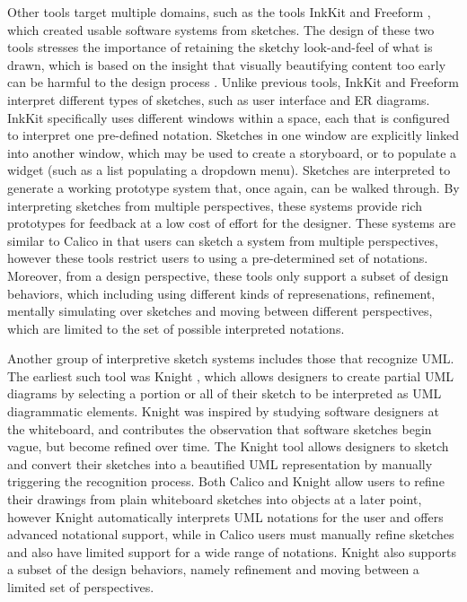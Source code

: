 Other tools target multiple domains, such as the tools InkKit \citep{Plimmer} and Freeform \citep{chung2005inkkit}, which created usable software systems from sketches. The design of these two tools stresses the importance of retaining the sketchy look-and-feel of what is drawn, which is based on the insight that visually beautifying content too early can be harmful to the design process \citep{Shipman}. Unlike previous tools, InkKit and Freeform interpret different types of sketches, such as user interface and ER diagrams. InkKit specifically uses different windows within a space, each that is configured to interpret one pre-defined notation. Sketches in one window are explicitly linked into another window, which may be used to create a storyboard, or to populate a widget (such as a list populating a dropdown menu). Sketches are interpreted to generate a working prototype system that, once again, can be walked through. By interpreting sketches from multiple perspectives, these systems provide rich prototypes for feedback at a low cost of effort for the designer. These systems are similar to Calico in that users can sketch a system from multiple perspectives, however these tools restrict users to using a pre-determined set of notations. Moreover, from a design perspective, these tools only support a subset of design behaviors, which including using different kinds of represenations, refinement, mentally simulating over sketches and moving between different perspectives, which are limited to the set of possible interpreted notations.

Another group of interpretive sketch systems includes those that recognize UML. The earliest such tool was Knight \citep{damm2000tool}, which allows  designers to create partial UML diagrams by selecting a portion or all of their sketch to be interpreted as UML diagrammatic elements. Knight was inspired by studying software designers at the whiteboard, and contributes the observation that software sketches begin vague, but become refined over time. The Knight tool allows designers to sketch and convert their sketches into a beautified UML representation by manually triggering the recognition process. Both Calico and Knight allow users to refine their drawings from plain whiteboard sketches into objects at a later point, however Knight automatically interprets UML notations for the user and offers advanced notational support, while in Calico users must manually refine sketches and also have limited support for a wide range of notations. Knight also supports a subset of the design behaviors, namely refinement and moving between a limited set of perspectives.

